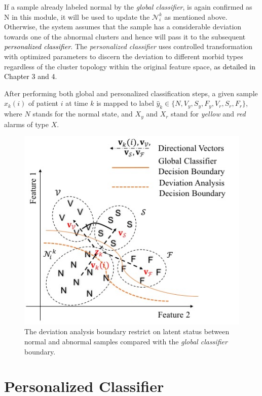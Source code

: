 If a sample already labeled normal by the \textit{global classifier}, is again confirmed as N in this module, it will be used to update the $\mathcal{N}_i^k$ as mentioned above. Otherwise, the system assumes that the sample has a considerable deviation towards one of the abnormal clusters and hence will pass it to the subsequent \textcolor{black}{\textit{personalized classifier}}. The \textit{personalized classifier} uses controlled transformation with optimized parameters to discern the deviation to different morbid types regardless of the cluster topology within the original feature space\textcolor{black}{, as detailed in Chapter 3 and 4}. 

After performing both global and personalized classification steps, a given sample $x_k(i)$ of patient $i$ at time $k$ is mapped to label $\hat{y}_k \in \{N,V_y,S_y,F_y,V_r,S_r,F_r\}$, where $N$ stands for the normal state, and $X_y$ and $X_r$ stand for \textit{yellow} and \textit{red} alarms of type $X$.

\begin{figure}[t]
\centering
\includegraphics[scale=.7]{Fig/topology.jpg}
\caption{The deviation analysis boundary restrict on latent status between normal and abnormal samples compared with the \textit{global classifier} boundary.}
\label{fig:topo_deviation}
\end{figure}


\section{Personalized Classifier} %

